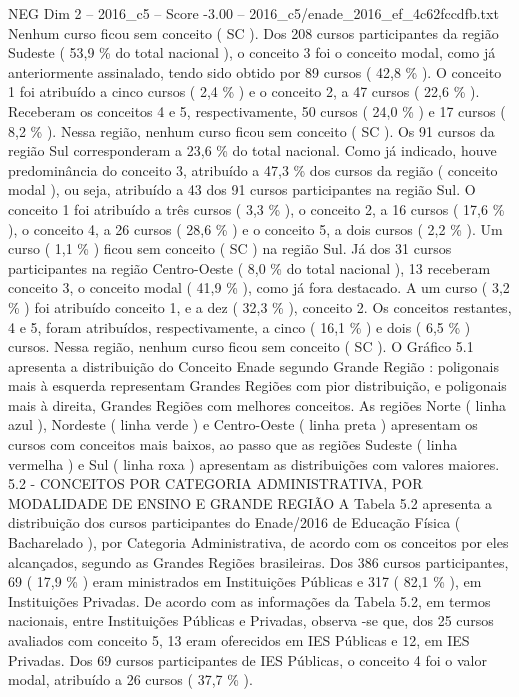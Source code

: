 \begin{textsample}{NEG Dim 2 – 2016\_c5 – Score -3.00 – 2016\_c5/enade\_2016\_ef\_4c62fccdfb.txt}
Nenhum curso ficou sem conceito ( SC ).
Dos 208 cursos participantes da região Sudeste ( 53,9 \% do total nacional ), o conceito 3 foi o conceito modal, como já anteriormente assinalado, tendo sido obtido por 89 cursos ( 42,8 \% ).
O conceito 1 foi atribuído a cinco cursos ( 2,4 \% ) e o conceito 2, a 47 cursos ( 22,6 \% ).
Receberam os conceitos 4 e 5, respectivamente, 50 cursos ( 24,0 \% ) e 17 cursos ( 8,2 \% ).
Nessa região, nenhum curso ficou sem conceito ( SC ).
Os 91 cursos da região Sul corresponderam a 23,6 \% do total nacional.
Como já indicado, houve predominância do conceito 3, atribuído a 47,3 \% dos cursos da região ( conceito modal ), ou seja, atribuído a 43 dos 91 cursos participantes na região Sul.
O conceito 1 foi atribuído a três cursos ( 3,3 \% ), o conceito 2, a 16 cursos ( 17,6 \% ), o conceito 4, a 26 cursos ( 28,6 \% ) e o conceito 5, a dois cursos ( 2,2 \% ).
Um curso ( 1,1 \% ) ficou sem conceito ( SC ) na região Sul.
Já dos 31 cursos participantes na região Centro-Oeste ( 8,0 \% do total nacional ), 13 receberam conceito 3, o conceito modal ( 41,9 \% ), como já fora destacado.
A um curso ( 3,2 \% ) foi atribuído conceito 1, e a dez ( 32,3 \% ), conceito 2.
Os conceitos restantes, 4 e 5, foram atribuídos, respectivamente, a cinco ( 16,1 \% ) e dois ( 6,5 \% ) cursos.
Nessa região, nenhum curso ficou sem conceito ( SC ).
O Gráfico 5.1 apresenta a distribuição do Conceito Enade segundo Grande Região : poligonais mais à esquerda representam Grandes Regiões com pior distribuição, e poligonais mais à direita, Grandes Regiões com melhores conceitos.
As regiões Norte ( linha azul ), Nordeste ( linha verde ) e Centro-Oeste ( linha preta ) apresentam os cursos com conceitos mais baixos, ao passo que as regiões Sudeste ( linha vermelha ) e Sul ( linha roxa ) apresentam as distribuições com valores maiores. 5.2 - CONCEITOS POR CATEGORIA ADMINISTRATIVA, POR MODALIDADE DE ENSINO E GRANDE REGIÃO A Tabela 5.2 apresenta a distribuição dos cursos participantes do Enade/2016 de Educação Física ( Bacharelado ), por Categoria Administrativa, de acordo com os conceitos por eles alcançados, segundo as Grandes Regiões brasileiras.
Dos 386 cursos participantes, 69 ( 17,9 \% ) eram ministrados em Instituições Públicas e 317 ( 82,1 \% ), em Instituições Privadas.
De acordo com as informações da Tabela 5.2, em termos nacionais, entre Instituições Públicas e Privadas, observa -se que, dos 25 cursos avaliados com conceito 5, 13 eram oferecidos em IES Públicas e 12, em IES Privadas.
Dos 69 cursos participantes de IES Públicas, o conceito 4 foi o valor modal, atribuído a 26 cursos ( 37,7 \% ).

\end{textsample}
